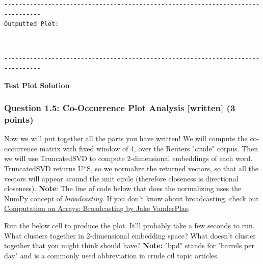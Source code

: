 \documentclass[11pt]{article}
\begin{document}
    \begin{Verbatim}[commandchars=\\\{\}]
--------------------------------------------------------------------------------
Outputted Plot:

    \end{Verbatim}

    \begin{center}
    \end{center}
    { \hspace*{\fill} \\}
    
    \begin{Verbatim}[commandchars=\\\{\}]
--------------------------------------------------------------------------------

    \end{Verbatim}

    \textbf{Test Plot Solution} 

    \subsubsection{Question 1.5: Co-Occurrence Plot Analysis {[}written{]}
(3
points)}\label{question-1.5-co-occurrence-plot-analysis-written-3-points}

Now we will put together all the parts you have written! We will compute
the co-occurrence matrix with fixed window of 4, over the Reuters
"crude" corpus. Then we will use TruncatedSVD to compute 2-dimensional
embeddings of each word. TruncatedSVD returns U*S, so we normalize the
returned vectors, so that all the vectors will appear around the unit
circle (therefore closeness is directional closeness). \textbf{Note}:
The line of code below that does the normalizing uses the NumPy concept
of \emph{broadcasting}. If you don't know about broadcasting, check out
\href{https://jakevdp.github.io/PythonDataScienceHandbook/02.05-computation-on-arrays-broadcasting.html}{Computation
on Arrays: Broadcasting by Jake VanderPlas}.

Run the below cell to produce the plot. It'll probably take a few
seconds to run. What clusters together in 2-dimensional embedding space?
What doesn't cluster together that you might think should have?
\textbf{Note:} "bpd" stands for "barrels per day" and is a commonly used
abbreviation in crude oil topic articles.
\end{document}
